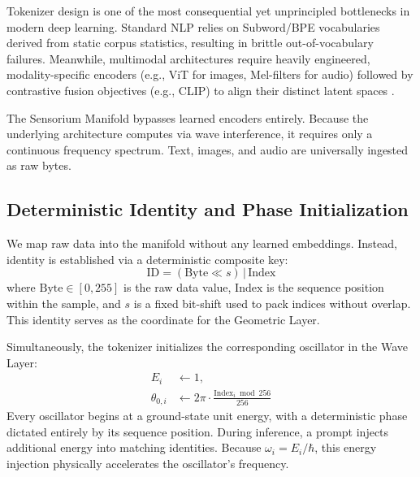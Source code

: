 \documentclass[11pt,a4paper]{article}
\begin{document}
Tokenizer design is one of the most consequential yet unprincipled bottlenecks in modern deep learning. Standard NLP relies on Subword/BPE vocabularies derived from static corpus statistics, resulting in brittle out-of-vocabulary failures. Meanwhile, multimodal architectures require heavily engineered, modality-specific encoders (e.g., ViT for images, Mel-filters for audio) followed by contrastive fusion objectives (e.g., CLIP) to align their distinct latent spaces \citep{radford2021learning}. 

The Sensorium Manifold bypasses learned encoders entirely. Because the underlying architecture computes via wave interference, it requires only a continuous frequency spectrum. Text, images, and audio are universally ingested as raw bytes.

\subsection{Deterministic Identity and Phase Initialization}
\label{sec:position_phase}

We map raw data into the manifold without any learned embeddings. Instead, identity is established via a deterministic composite key:
\begin{equation}
\text{ID} = (\text{Byte} \ll s)\,|\,\text{Index}
\label{eq:token_id}
\end{equation}
where $\text{Byte} \in [0, 255]$ is the raw data value, $\text{Index}$ is the sequence position within the sample, and $s$ is a fixed bit-shift used to pack indices without overlap. This identity serves as the coordinate for the Geometric Layer.

Simultaneously, the tokenizer initializes the corresponding oscillator in the Wave Layer:
\begin{align}
E_i &\leftarrow 1, \\
\theta_{0,i} &\leftarrow 2\pi \cdot \frac{\text{Index}_i \bmod 256}{256}
\label{eq:phase_from_position}
\end{align}
Every oscillator begins at a ground-state unit energy, with a deterministic phase dictated entirely by its sequence position. During inference, a prompt injects additional energy into matching identities. Because $\omega_i = E_i/\hbar$, this energy injection physically accelerates the oscillator's frequency.
\end{document}
